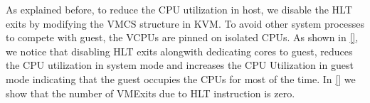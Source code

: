 As explained before, to reduce the CPU utilization in 
host, we disable the HLT exits by modifying the VMCS 
structure in KVM. To avoid other system processes 
to compete with guest, the VCPUs are pinned on isolated 
CPUs. As shown in \ref{}, we notice that disabling HLT exits 
alongwith dedicating cores to guest, reduces the 
CPU utilization in system
mode and increases the CPU Utilization in guest mode
indicating that the guest occupies the CPUs for most
of the time. In \ref{} we show that the number of VMExits
due to HLT instruction is zero.

